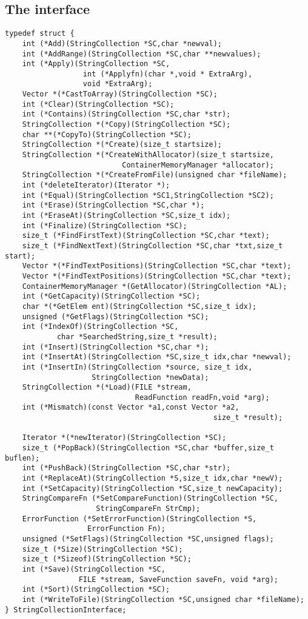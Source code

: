 \documentclass[12pt,a4paper]{memoir} %
\begin{document}
{{\subsection{The interface}
\begin{verbatim}
typedef struct {
    int (*Add)(StringCollection *SC,char *newval);
    int (*AddRange)(StringCollection *SC,char **newvalues);
    int (*Apply)(StringCollection *SC,
                  int (*Applyfn)(char *,void * ExtraArg),
                  void *ExtraArg);
    Vector *(*CastToArray)(StringCollection *SC);
    int (*Clear)(StringCollection *SC);
    int (*Contains)(StringCollection *SC,char *str);
    StringCollection *(*Copy)(StringCollection *SC);
    char **(*CopyTo)(StringCollection *SC);
    StringCollection *(*Create)(size_t startsize);
    StringCollection *(*CreateWithAllocator)(size_t startsize,
                           ContainerMemoryManager *allocator);    
    StringCollection *(*CreateFromFile)(unsigned char *fileName);
    int (*deleteIterator)(Iterator *);
    int (*Equal)(StringCollection *SC1,StringCollection *SC2);
    int (*Erase)(StringCollection *SC,char *);
    int (*EraseAt)(StringCollection *SC,size_t idx);
    int (*Finalize)(StringCollection *SC);
    size_t (*FindFirstText)(StringCollection *SC,char *text);
    size_t (*FindNextText)(StringCollection *SC,char *txt,size_t start);
    Vector *(*FindTextPositions)(StringCollection *SC,char *text);
    Vector *(*FindTextPositions)(StringCollection *SC,char *text);
    ContainerMemoryManager *(GetAllocator)(StringCollection *AL);
    int (*GetCapacity)(StringCollection *SC);
    char *(*GetElem ent)(StringCollection *SC,size_t idx);
    unsigned (*GetFlags)(StringCollection *SC);
    int (*IndexOf)(StringCollection *SC,
            char *SearchedString,size_t *result);
    int (*Insert)(StringCollection *SC,char *);
    int (*InsertAt)(StringCollection *SC,size_t idx,char *newval);
    int (*InsertIn)(StringCollection *source, size_t idx, 
                    StringCollection *newData);
    StringCollection *(*Load)(FILE *stream, 
                              ReadFunction readFn,void *arg);
    int (*Mismatch)(const Vector *a1,const Vector *a2,
                                                size_t *result);

    Iterator *(*newIterator)(StringCollection *SC);
    size_t (*PopBack)(StringCollection *SC,char *buffer,size_t buflen);
    int (*PushBack)(StringCollection *SC,char *str);
    int (*ReplaceAt)(StringCollection *S,size_t idx,char *newV);
    int (*SetCapacity)(StringCollection *SC,size_t newCapacity);
    StringCompareFn (*SetCompareFunction)(StringCollection *SC,
                     StringCompareFn StrCmp);
    ErrorFunction (*SetErrorFunction)(StringCollection *S, 
                   ErrorFunction Fn);
    unsigned (*SetFlags)(StringCollection *SC,unsigned flags);
    size_t (*Size)(StringCollection *SC);
    size_t (*Sizeof)(StringCollection *SC);
    int (*Save)(StringCollection *SC,
                 FILE *stream, SaveFunction saveFn, void *arg);
    int (*Sort)(StringCollection *SC);
    int (*WriteToFile)(StringCollection *SC,unsigned char *fileName);
} StringCollectionInterface;


\end{verbatim}}}
\end{document}
